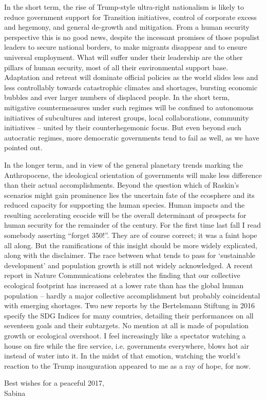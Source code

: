 \documentclass[10pt,a4paper]{article}
\begin{document}
\begin{multicols}{2}
In the short term, the rise of Trump-style ultra-right nationalism is likely to reduce government support for Transition initiatives, control of corporate excess and hegemony, and general de-growth and mitigation. From a human security perspective this is no good news, despite the incessant promises of those populist leaders to secure national borders, to make migrants disappear and to ensure universal employment. What will suffer under their leadership are the other pillars of human security, most of all their environmental support base. Adaptation and retreat will dominate official policies as the world slides less and less controllably towards catastrophic climates and shortages, bursting economic bubbles and ever larger numbers of displaced people. In the short term, mitigative countermeasures under such regimes will be confined to autonomous initiatives of subcultures and interest groups, local collaborations, community initiatives – united by their counterhegemonic focus. But even beyond such autocratic regimes, more democratic governments tend to fail as well, as we have pointed out. 

In the longer term, and in view of the general planetary trends marking the Anthropocene, the ideological orientation of governments will make less difference than their actual accomplishments. Beyond the question which of Raskin’s scenarios might gain prominence lies the uncertain fate of the ecosphere and its reduced capacity for supporting the human species. Human impacts and the resulting  accelerating ecocide will be the overall determinant of prospects for human security for the remainder of the century. For the first time last fall I read somebody asserting ``forget 350!''. They are of course correct; it was a faint hope all along. But the ramifications of this insight should be more widely explicated, along with the disclaimer. The race between what tends to pass for `sustainable development' and population growth is still not widely acknowledged. A recent report in Nature Communications \citep{r12} celebrates the finding that our collective ecological footprint has increased at a lower rate than has the global human population – hardly a major collective accomplishment but probably coincidental with emerging shortages. Two new reports by the Bertelsmann Stiftung in 2016 specify the SDG Indices for many countries, detailing their performances on all seventeen goals and their subtargets. No mention at all is made of population growth or ecological overshoot. I feel increasingly like a spectator watching a house on fire while the fire service, i.e. governments everywhere, blows hot air instead of water into it. In the midst of that emotion, watching the world's reaction to the Trump inauguration appeared to me as a ray of hope, for now.

\vspace{\baselineskip}

\noindent Best wishes for a peaceful 2017,\\
Sabina


\end{multicols}
\end{document}
